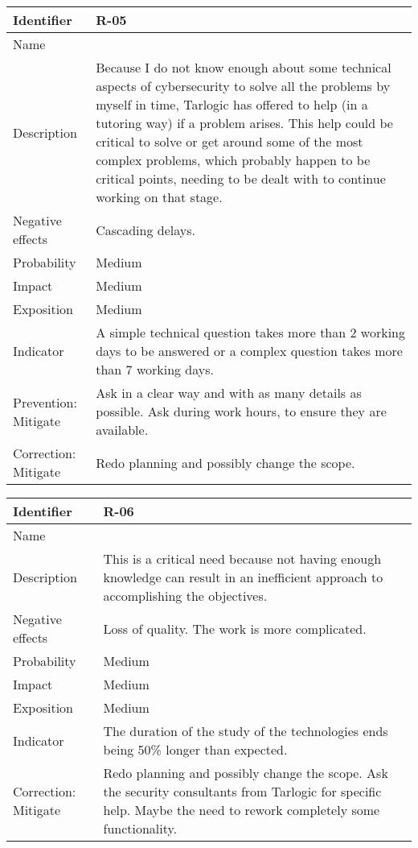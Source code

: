\begin{table}[H]
	\begin{tabularx}{\textwidth}{|y|z|}
		\hline
		Identifier & \textbf{R-05} \\ \hline
		Name & \Rcinco \\ \hline
		Description &
			Because I do not know enough about some technical aspects of cybersecurity to solve all the problems by myself in time, Tarlogic has offered to help (in a tutoring way) if a problem arises. \linej
			This help could be critical to solve or get around some of the most complex problems, which probably happen to be critical points, needing to be dealt with to continue working on that stage.
		\\ \hline
		Negative effects &
			Cascading delays.
		\\ \hline
		Probability & Medium\\ \hline
		Impact &  Medium\\ \hline
		Exposition &  Medium\\ \hline
		Indicator & A simple technical question takes more than 2 working days to be answered or a complex question takes more than 7 working days.\\ \hline
		Prevention: Mitigate &
			Ask in a clear way and with as many details as possible. \linej
			Ask during work hours, to ensure they are available.
		\\ \hline
		Correction: Mitigate &
			Redo planning and possibly change the scope.
		\\ \hline
	\end{tabularx}
\end{table}

\begin{table}[H]
	\begin{tabularx}{\textwidth}{|y|z|}
		\hline
		Identifier & \textbf{R-06} \\ \hline
		Name & \Rseis \\ \hline
		Description &
			This is a critical need because not having enough knowledge can result in an inefficient approach to accomplishing the objectives.
		\\ \hline
		Negative effects &
			Loss of quality. \linej
			The work is more complicated.
		\\ \hline
		Probability & Medium\\ \hline
		Impact &  Medium\\ \hline
		Exposition &  Medium\\ \hline
		Indicator & The duration of the study of the technologies ends being 50\% longer than expected. \\ \hline
		Correction: Mitigate &
			Redo planning and possibly change the scope.  \linej
			Ask the security consultants from Tarlogic for specific help. \linej
			Maybe the need to rework completely some functionality.
		\\ \hline
	\end{tabularx}
\end{table}

